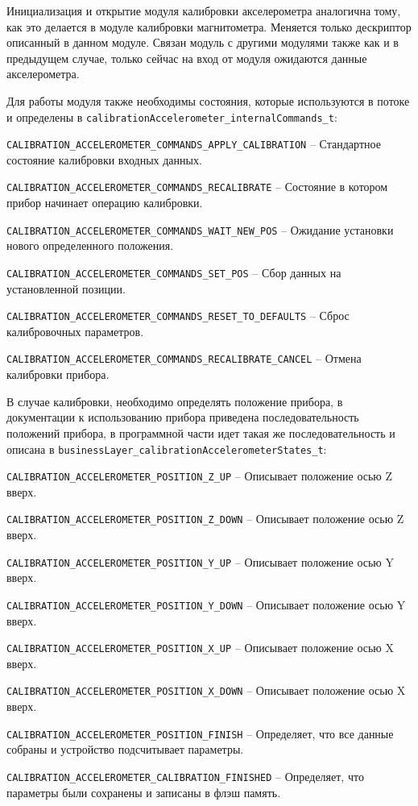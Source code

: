 Инициализация и открытие модуля калибровки акселерометра аналогична тому, как это делается в модуле калибровки магнитометра. Меняется только дескриптор описанный в данном модуле.
Связан модуль с другими модулями также как и в предыдущем случае, только сейчас на вход от модуля \modulePerifery ожидаются данные акселерометра.

Для работы модуля также необходимы состояния, которые используются в потоке и определены в \lstinline{calibrationAccelerometer_internalCommands_t}:

\begin{enumerate_num}
    \item \lstinline{CALIBRATION_ACCELEROMETER_COMMANDS_APPLY_CALIBRATION} -- Стандартное состояние калибровки входных данных.
    \item \lstinline{CALIBRATION_ACCELEROMETER_COMMANDS_RECALIBRATE} -- Состояние в котором прибор начинает операцию калибровки.
    \item \lstinline{CALIBRATION_ACCELEROMETER_COMMANDS_WAIT_NEW_POS} -- Ожидание установки нового определенного положения.
    \item \lstinline{CALIBRATION_ACCELEROMETER_COMMANDS_SET_POS} -- Сбор данных на установленной позиции.
    \item \lstinline{CALIBRATION_ACCELEROMETER_COMMANDS_RESET_TO_DEFAULTS} -- Сброс калибровочных параметров.
    \item \lstinline{CALIBRATION_ACCELEROMETER_COMMANDS_RECALIBRATE_CANCEL} -- Отмена калибровки прибора.
\end{enumerate_num}

В случае калибровки, необходимо определять положение прибора, в документации к использованию прибора приведена последовательность положений прибора,
в программной части идет такая же последовательность и описана в \lstinline{businessLayer_calibrationAccelerometerStates_t}:

\begin{enumerate_num}
    \item \lstinline{CALIBRATION_ACCELEROMETER_POSITION_Z_UP} -- Описывает положение осью Z вверх.
    \item \lstinline{CALIBRATION_ACCELEROMETER_POSITION_Z_DOWN} -- Описывает положение осью Z вверх.
    \item \lstinline{CALIBRATION_ACCELEROMETER_POSITION_Y_UP} -- Описывает положение осью Y вверх.
    \item \lstinline{CALIBRATION_ACCELEROMETER_POSITION_Y_DOWN} -- Описывает положение осью Y вверх.
    \item \lstinline{CALIBRATION_ACCELEROMETER_POSITION_X_UP} -- Описывает положение осью X вверх.
    \item \lstinline{CALIBRATION_ACCELEROMETER_POSITION_X_DOWN} -- Описывает положение осью X вверх.
    \item \lstinline{CALIBRATION_ACCELEROMETER_POSITION_FINISH} -- Определяет, что все данные собраны и устройство подсчитывает параметры.
    \item \lstinline{CALIBRATION_ACCELEROMETER_CALIBRATION_FINISHED} -- Определяет, что параметры были сохранены и записаны в флэш память.
\end{enumerate_num}

